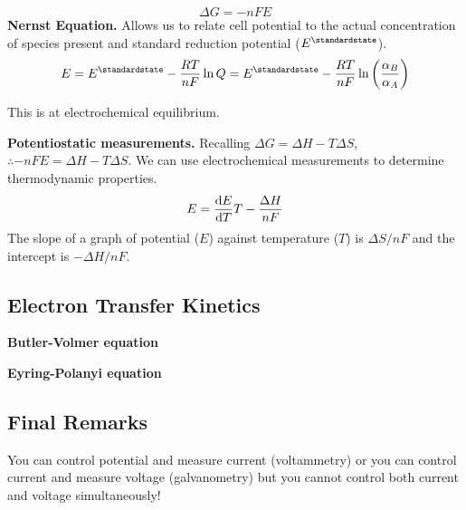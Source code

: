 \begin{equation*}
    \Delta G = -nFE
\end{equation*}
\textbf{Nernst Equation.} Allows us to relate cell potential to the actual concentration of species
present and standard reduction potential ($E^\standardstate$).
\begin{equation*}
    E = E^\standardstate - \frac{RT}{nF} \ln Q = E^\standardstate - \frac{RT}{nF} \ln\left(\frac{\alpha_B}{\alpha_A}\right)
\end{equation*}

This is at electrochemical equilibrium.



\textbf{Potentiostatic measurements.} Recalling $\Delta G = \Delta H - T \Delta S$, 
$ \therefore - nFE = \Delta H - T \Delta S$. We can use electrochemical measurements to determine
thermodynamic properties.
\begin{equation*}
    E = \odv{E}{T}T - \frac{\Delta H}{nF}
\end{equation*} The slope of a graph of potential ($E$) against temperature ($T$)
is $\Delta S / nF$ and the intercept is $- \Delta H / nF$.

\subsection*{Electron Transfer Kinetics}

\textbf{Butler-Volmer equation}

\textbf{Eyring-Polanyi equation}

\subsection*{Final Remarks}
You can control potential and measure current (voltammetry) or you can control current
and measure voltage (galvanometry) but you cannot control both current and voltage
simultaneously!

